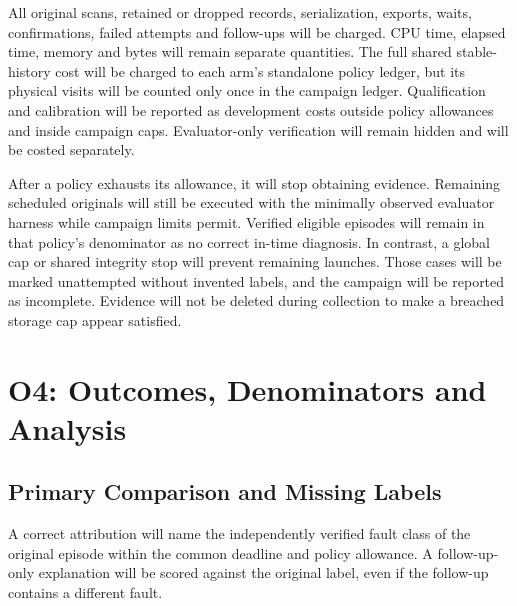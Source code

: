 All original scans, retained or dropped records, serialization, exports, waits, confirmations, failed attempts and follow-ups will be charged. CPU time, elapsed time, memory and bytes will remain separate quantities. The full shared stable-history cost will be charged to each arm's standalone policy ledger, but its physical visits will be counted only once in the campaign ledger. Qualification and calibration will be reported as development costs outside policy allowances and inside campaign caps. Evaluator-only verification will remain hidden and will be costed separately.

After a policy exhausts its allowance, it will stop obtaining evidence. Remaining scheduled originals will still be executed with the minimally observed evaluator harness while campaign limits permit. Verified eligible episodes will remain in that policy's denominator as no correct in-time diagnosis. In contrast, a global cap or shared integrity stop will prevent remaining launches. Those cases will be marked unattempted without invented labels, and the campaign will be reported as incomplete. Evidence will not be deleted during collection to make a breached storage cap appear satisfied.

\section{O4: Outcomes, Denominators and Analysis}
\label{sec:o4-analysis}

\subsection{Primary Comparison and Missing Labels}

A correct attribution will name the independently verified fault class of the original episode within the common deadline and policy allowance. A follow-up-only explanation will be scored against the original label, even if the follow-up contains a different fault.

